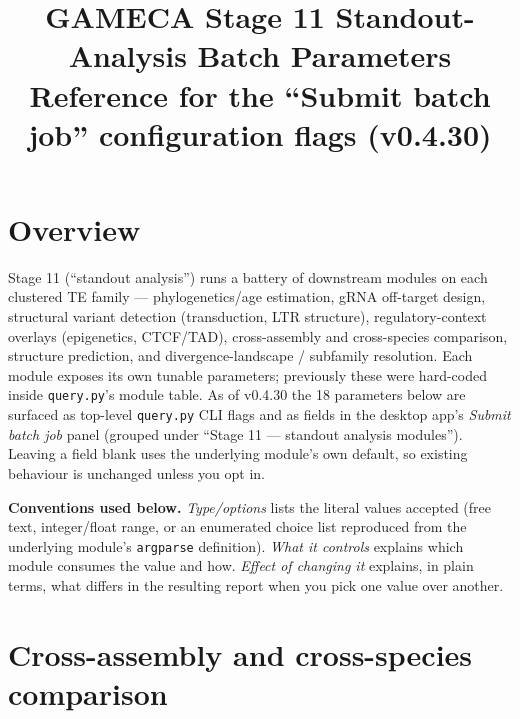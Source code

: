 \documentclass[11pt]{article}
\title{GAMECA Stage 11 Standout-Analysis Batch Parameters \\[2pt]
\large Reference for the ``Submit batch job'' configuration flags (v0.4.30)}
\author{}
\date{}
\begin{document}
\maketitle

\section*{Overview}
Stage 11 (``standout analysis'') runs a battery of downstream modules on each clustered
TE family — phylogenetics/age estimation, gRNA off-target design, structural variant
detection (transduction, LTR structure), regulatory-context overlays (epigenetics,
CTCF/TAD), cross-assembly and cross-species comparison, structure prediction, and
divergence-landscape / subfamily resolution. Each module exposes its own tunable
parameters; previously these were hard-coded inside \texttt{query.py}'s module table.
As of v0.4.30 the 18 parameters below are surfaced as top-level \texttt{query.py} CLI
flags and as fields in the desktop app's \emph{Submit batch job} panel (grouped under
``Stage 11 — standout analysis modules''). Leaving a field blank uses the underlying
module's own default, so existing behaviour is unchanged unless you opt in.

\bigskip
\noindent\textbf{Conventions used below.}
\emph{Type/options} lists the literal values accepted (free text, integer/float range,
or an enumerated choice list reproduced from the underlying module's \texttt{argparse}
definition). \emph{What it controls} explains which module consumes the value and how.
\emph{Effect of changing it} explains, in plain terms, what differs in the resulting
report when you pick one value over another.

\section{Cross-assembly and cross-species comparison}
\end{document}
